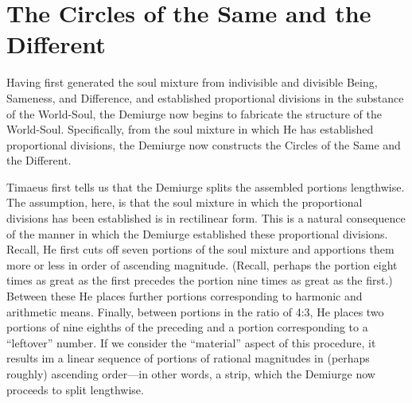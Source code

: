 
\section{The Circles of the Same and the Different} %
\label{sec:the_circles_of_the_same_and_the_different}

Having first generated the soul mixture from indivisible and divisible Being, Sameness, and Difference, and established proportional divisions in the substance of the World-Soul, the Demiurge now begins to fabricate the structure of the World-Soul. Specifically, from the soul mixture in which He has established proportional divisions, the Demiurge now constructs the Circles of the Same and the Different.

Timaeus first tells us that the Demiurge splits the assembled portions lengthwise. The assumption, here, is that the soul mixture in which the proportional divisions has been established is in rectilinear form. This is a natural consequence of the manner in which the Demiurge established these proportional divisions. Recall, He first cuts off seven portions of the soul mixture and apportions them more or less in order of ascending magnitude. (Recall, perhaps the portion eight times as great as the first precedes the portion nine times as great as the first.) Between these He places further portions corresponding to harmonic and arithmetic means. Finally, between portions in the ratio of 4:3, He places two portions of nine eighths of the preceding and a portion corresponding to a ``leftover'' number. If we consider the ``material'' aspect of this procedure, it results im a linear sequence of portions of rational magnitudes in (perhaps roughly) ascending order---in other words, a strip, which the Demiurge now proceeds to split lengthwise.

